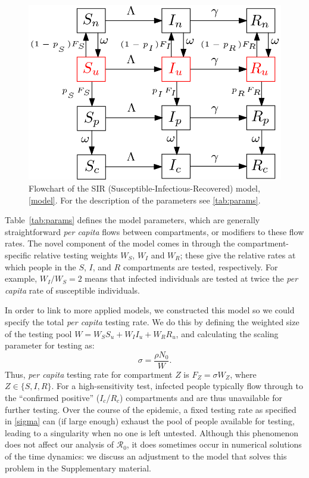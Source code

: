 \documentclass[12pt]{article}
\newcommand{\percap}{\emph{per capita}\xspace}
\newcommand{\Rnum}{\mathcal{R}_0}
\theoremstyle{definition} %
\begin{document}
\begin{figure}[!h] 
\begin{center} 
\includegraphics[scale=0.3]{./pix/sir_comp.png}
\caption{\small Flowchart of the SIR (Susceptible-Infectious-Recovered) model, \ref{model}. For the description of the parameters see \cref{tab:params}.
\label{fig:flowchart}}
\end{center} 
\end{figure}

Table~\ref{tab:params} defines the model parameters, which are generally straightforward
\percap flows between compartments, or modifiers to these flow rates.
The novel component of the model comes in through the compartment-specific relative testing weights $W_S$, $W_I$ and $W_R$; these give the relative rates at which people in the $S$, $I$, and $R$ compartments are tested, respectively. For example, $W_I/W_S=2$ means that infected individuals are tested at twice the \percap rate of susceptible individuals. 

In order to link to more applied models, we constructed this model so we could specify the total \percap testing rate. We do this by defining the weighted size of the testing pool $W = W_S S_u + W_I I_u + W_R R_u$, and calculating the scaling parameter for testing as:
\begin{equation}
\label{sigma}
\sigma = \frac{\rho N_0}{W}.
\end{equation}
Thus, \percap testing rate for compartment $Z$ is $F_Z=\sigma W_Z$, where $Z \in \{S,I,R\}$.
For a high-sensitivity test, infected people typically flow through to the ``confirmed positive'' ($I_c$/$R_c$) compartments and are thus unavailable for further testing.
Over the course of the epidemic, a fixed testing rate as specified in \eqref{sigma} can
(if large enough) exhaust the pool of people available for testing,
leading to a singularity when no one is left untested.
Although this phenomenon does not affect our analysis of $\Rnum$, it does sometimes occur in
numerical solutions of the time dynamics: we discuss an adjustment to the model that solves
this problem in the Supplementary material. 
\end{document}
